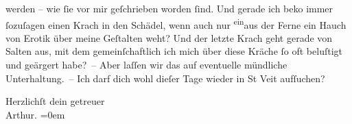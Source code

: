                werden – wie{ }ſie vor mir geſchrieben worden{ }ſind. Und gerade ich beko{\geminationm} immer{ }ſozuſagen einen Krach in den Schädel, wenn auch
               nur \substVorne{}\textsuperscript{ein}\substDazwischen{}aus\substHinten{} der Ferne ein Hauch von Erotik über meine Geſtalten weht? {\pb}Und der letzte Krach
               geht gerade von Salten aus, mit dem
               gemeinſchaftlich ich mich über diese Kräche \introOben{}ſo oft\introOben{} beluſtigt
               und geärgert habe? – Aber laſſen wir das auf eventuelle mündliche Unterhaltung. – Ich
               darf dich wohl dieſer Tage wieder in St Veit
               aufſuchen?\pend
           
\pstart
           Herzlichſt dein getreuer{\\[\baselineskip]}\spacefill\mbox{Arthur.}\pend
           \leftskip=0em{}\endnumbering{}  \newcommand{\dateiname}{L01338}\newcommand{\titel}{Arthur Schnitzler an Hermann Bahr, 10. 11. 1903}\newcommand{\editorInnen}{Herausgegeben von Martin Anton Müller}
